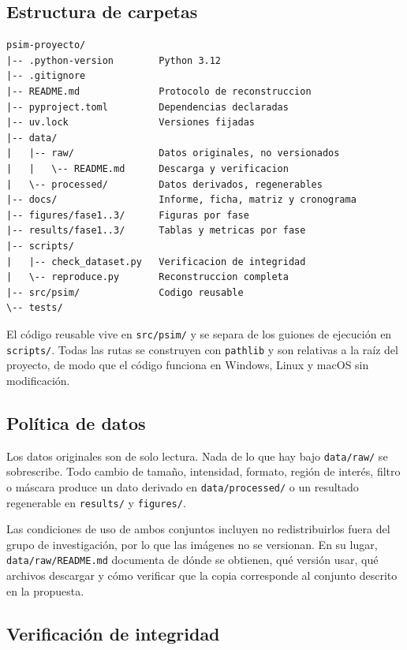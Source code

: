 \documentclass[12pt,a4paper]{article}
\begin{document}
\subsection{Estructura de carpetas}

\begin{verbatim}
psim-proyecto/
|-- .python-version        Python 3.12
|-- .gitignore
|-- README.md              Protocolo de reconstruccion
|-- pyproject.toml         Dependencias declaradas
|-- uv.lock                Versiones fijadas
|-- data/
|   |-- raw/               Datos originales, no versionados
|   |   \-- README.md      Descarga y verificacion
|   \-- processed/         Datos derivados, regenerables
|-- docs/                  Informe, ficha, matriz y cronograma
|-- figures/fase1..3/      Figuras por fase
|-- results/fase1..3/      Tablas y metricas por fase
|-- scripts/
|   |-- check_dataset.py   Verificacion de integridad
|   \-- reproduce.py       Reconstruccion completa
|-- src/psim/              Codigo reusable
\-- tests/
\end{verbatim}

El código reusable vive en \texttt{src/psim/} y se separa de los guiones de
ejecución en \texttt{scripts/}. Todas las rutas se construyen con
\texttt{pathlib} y son relativas a la raíz del proyecto, de modo que el código
funciona en Windows, Linux y macOS sin modificación.

\subsection{Política de datos}

Los datos originales son de solo lectura. Nada de lo que hay bajo
\texttt{data/raw/} se sobrescribe. Todo cambio de tamaño, intensidad, formato,
región de interés, filtro o máscara produce un dato derivado en
\texttt{data/processed/} o un resultado regenerable en \texttt{results/} y
\texttt{figures/}.

Las condiciones de uso de ambos conjuntos incluyen no redistribuirlos fuera del
grupo de investigación, por lo que las imágenes no se versionan. En su lugar,
\texttt{data/raw/README.md} documenta de dónde se obtienen, qué versión usar, qué
archivos descargar y cómo verificar que la copia corresponde al conjunto descrito
en la propuesta.

\subsection{Verificación de integridad}
\end{document}
